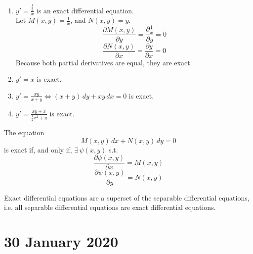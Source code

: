 \documentclass[twoside]{report}
\begin{document}
    \begin{example}
        \begin{enumerate}
            \item $y' = \frac{\frac{1}{y}}{x}$ is an exact differential equation.\\
            Let $M(x, y) = \frac{1}{x}$, and $N(x, y) = y$.
            \[\frac{\partial M(x,y)}{\partial y} = \frac{\partial \frac{1}{x}}{\partial y} = 0\]
            \[\frac{\partial N(x,y)}{\partial x} = \frac{\partial y}{\partial x} = 0\]
            Because both partial derivatives are equal, they are exact.
            \item $y' = x$ is exact.
            \item $y' = \frac{xy}{x + y} \iff (x + y)\,dy + xy\,dx = 0$ is exact.
            \item $y' = \frac{xy + x}{\frac{1}{2}x^2 + y}$ is exact.
        \end{enumerate}
    \end{example}
    \begin{btheorem}[Exactness]
        The equation \[
            M(x, y)\,dx + N(x, y)\,dy = 0
        \] is exact if, and only if, $\exists\,\psi(x, y)$ s.t.
        \[
            \frac{\partial \psi(x,y)}{\partial x} = M(x, y)
            \]\[
            \frac{\partial \psi(x,y)}{\partial y} = N(x, y)
        \]
    \end{btheorem}
    \begin{remark}[Relationship]
        Exact differential equations are a superset of the separable differential equations, i.e. all separable differential equations are exact differential equations.
    \end{remark}
    \chapter{30 January 2020}
\end{document}
